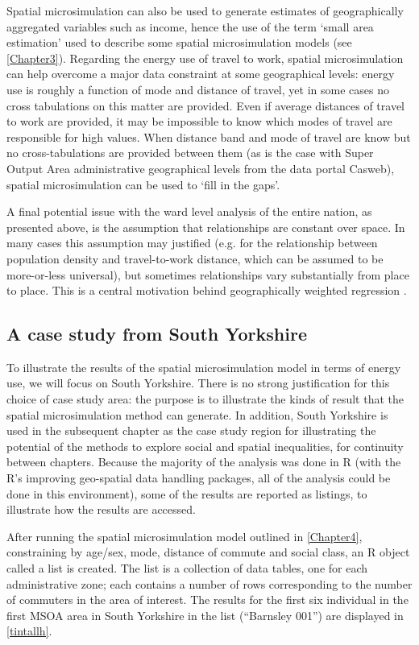 Spatial microsimulation can also be used to generate estimates of
geographically aggregated variables such as income, hence the use of the term
`small area estimation' used to describe some spatial microsimulation models
(see \cref{Chapter3}). Regarding the energy use of travel to work, spatial
microsimulation can help overcome a major data constraint at some geographical
levels: energy use is roughly a function of mode and distance of travel, yet
in some cases no cross tabulations on this matter are provided.
Even if average distances of travel to work are provided, it may be
impossible to know which modes of travel are responsible for high values.
When distance band and mode of travel are know but no cross-tabulations
are provided between them (as is the case with Super Output Area administrative
geographical levels from the data portal Casweb),
spatial microsimulation can be used to `fill in the gaps'.


A final potential issue with the ward level analysis of the entire nation, as presented
above, is the assumption that relationships are constant over space.
In many cases this assumption may justified (e.g. for the relationship between
population density and travel-to-work distance, which can be assumed to be
more-or-less universal), but sometimes relationships vary
substantially from place to place. This is a central motivation behind
geographically weighted regression \citep{Fotheringham2002}.

\subsection{A case study from South Yorkshire}
To illustrate the results of the spatial microsimulation model
in terms of energy use, we will focus on South Yorkshire.
There is no strong justification for this choice of case study
area:
the purpose is to illustrate the kinds of result that the
spatial microsimulation method can generate. In addition,
South Yorkshire is used in the subsequent chapter as the case study region
for illustrating the potential of the methods to explore social and spatial
inequalities, for continuity between chapters.
Because the majority of the analysis was done in R (with the R's
improving geo-spatial data handling packages, all of the analysis
could be done in this environment), some of the results are
reported as listings, to illustrate how the results are accessed.

After running the spatial microsimulation model outlined in
\cref{Chapter4}, constraining by age/sex, mode, distance of commute and
social class, an R object called a list is created. The list is a collection
of data tables, one for each administrative zone; each contains a number of
rows corresponding to the number of commuters in the area of interest.
The results for the first six individual in the first MSOA area
in South Yorkshire in the list (``Barnsley 001'') are displayed in
\cref{tintallh}.

